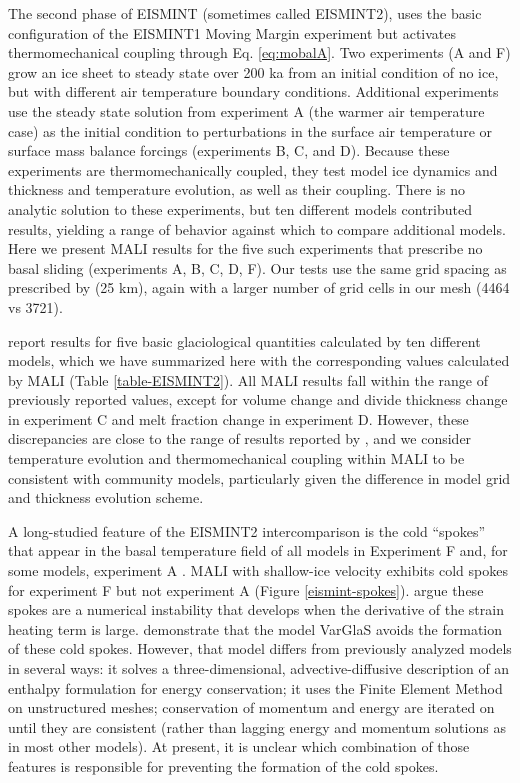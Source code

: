 The second phase of EISMINT \citep{payne2000} (sometimes called EISMINT2),
uses the basic configuration of the EISMINT1 Moving Margin experiment
but activates thermomechanical coupling through Eq. \ref{eq:mobalA}.
Two experiments (A and F) grow an ice sheet to steady state over 200 ka 
from an initial condition of no ice, but with different air temperature boundary conditions.
Additional experiments use the steady state solution from experiment A (the warmer air temperature case) as 
the initial condition to perturbations in the surface air temperature or surface mass balance forcings (experiments B, C, and D).
Because these experiments are thermomechanically coupled, they test
model ice dynamics and thickness and temperature evolution, as well as their coupling.
There is no analytic solution to these experiments,
but ten different models contributed results, yielding a range of behavior
against which to compare additional models.
Here we present MALI results for the five such experiments that prescribe no basal sliding (experiments A, B, C, D, F).
Our tests use the same grid spacing as prescribed by \citet{payne2000} (25 km),
again with a larger number of grid cells in our mesh (4464 vs 3721).

\citet{payne2000} report results for five basic glaciological quantities calculated by
ten different models, which we have summarized here with the corresponding values 
calculated by MALI (Table \ref{table-EISMINT2}).
All MALI results fall within the range of previously reported values,
except for volume change and divide thickness change in experiment C
and melt fraction change in experiment D.
However, these discrepancies are close to the range of results reported by \citet{payne2000},
and we consider temperature evolution and thermomechanical coupling within MALI
to be consistent with community models,
particularly given the difference in model grid and thickness evolution scheme.

A long-studied feature of the EISMINT2 intercomparison is the cold ``spokes'' that
appear in the basal temperature field of all models in Experiment F and, for some models, experiment A \citep{payne2000,Saito2006,bueler2007,brinkerhoff2013}.
MALI with shallow-ice velocity exhibits cold spokes for experiment F but not experiment A (Figure \ref{eismint-spokes}).
\citet{bueler2007} argue these spokes are a numerical instability that develops
when the derivative of the strain heating term is large.
\citet{brinkerhoff2013} demonstrate that the model VarGlaS avoids the formation of
these cold spokes. However, that model differs from previously analyzed models in several ways: 
it solves a three-dimensional, advective-diffusive description of an enthalpy formulation for energy conservation; it uses the Finite Element Method on unstructured meshes; conservation of momentum and energy are iterated on until they are consistent (rather than lagging energy and momentum solutions as in most other models). 
At present, it is unclear which combination of those features is responsible for preventing the formation of the cold spokes.

